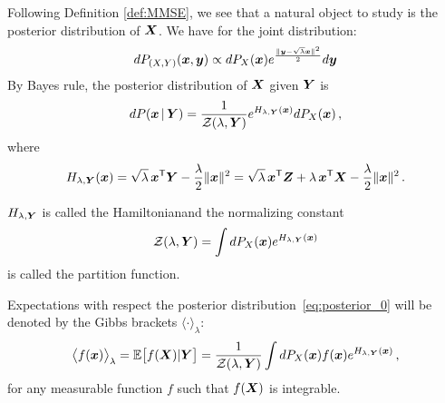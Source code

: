 \documentclass[12pt,nocut]{article}
\begin{document}
Following Definition \ref{def:MMSE}, we see that a natural object to study is the posterior distribution of ${\boldsymbol X}$.
We have for the joint distribution:
$$
dP_{(X,Y)}({\boldsymbol x},{\boldsymbol y}) \propto dP_X({\boldsymbol x}) e^{\frac{\| {\boldsymbol y}-\sqrt{\lambda}{\boldsymbol x}\|^2}{2}}d{\boldsymbol y}
$$
By Bayes rule, the posterior distribution of ${\boldsymbol X}$ given ${\boldsymbol Y}$ is
\begin{equation}\label{eq:posterior_0}
	dP( {\boldsymbol x} \, | \, {\boldsymbol Y}  ) 
	= \frac{1}{\mathcal{Z}(\lambda,{\boldsymbol Y})} e^{H_{\lambda,{\boldsymbol Y}}({\boldsymbol x})} dP_X({\boldsymbol x}) \,,
\end{equation}
where 
$$
H_{\lambda,{\boldsymbol Y}}({\boldsymbol x})=
\sqrt{\lambda}\, {\boldsymbol x}^{{\sf T}} {\boldsymbol Y} - \frac{\lambda}{2} \| {\boldsymbol x} \|^2
=
\sqrt{\lambda} \, {\boldsymbol x}^{{\sf T}} {\boldsymbol Z} + \lambda \, {\boldsymbol x}^{{\sf T}} {\boldsymbol X} - \frac{\lambda}{2} \| {\boldsymbol x} \|^2 \,.
$$
\begin{definition}
	$H_{\lambda,{\boldsymbol Y}}$ is called the Hamiltonian\protect\footnotemark and the normalizing constant
	$$
	\mathcal{Z}(\lambda,{\boldsymbol Y}) = \int dP_X({\boldsymbol x}) e^{H_{\lambda,{\boldsymbol Y}}({\boldsymbol x})}
	$$
	is called the partition function. 
\end{definition}
Expectations with respect the posterior distribution~\eqref{eq:posterior_0} will be denoted by the Gibbs brackets $\langle \cdot \rangle_{\lambda}$:
$$
\big\langle f({\boldsymbol x}) \big\rangle_{\lambda}
= \mathbb{E} \big[f({\boldsymbol X})|{\boldsymbol Y} \big]
= \frac{1}{\mathcal{Z}(\lambda,{\boldsymbol Y})} \int dP_X({\boldsymbol x}) f({\boldsymbol x}) e^{H_{\lambda,{\boldsymbol Y}}({\boldsymbol x})} \,,
$$
for any measurable function $f$ such that $f({\boldsymbol X})$ is integrable.
\end{document}
